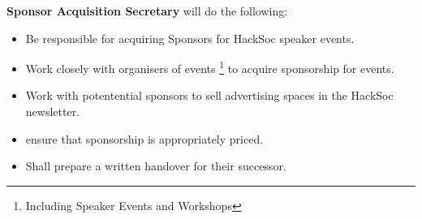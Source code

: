 \item \textbf{Sponsor Acquisition Secretary} will do the following:
\begin{itemize}
	\item Be responsible for acquiring Sponsors for HackSoc speaker events.
	\item Work closely with organisers of events \footnote{Including Speaker Events and Workshops} to acquire sponsorship for events.
	\item Work with potentential sponsors to sell advertising spaces in the HackSoc newsletter.
	\item ensure that sponsorship is appropriately priced.
	\item Shall prepare a written handover for their successor.
\end{itemize}
